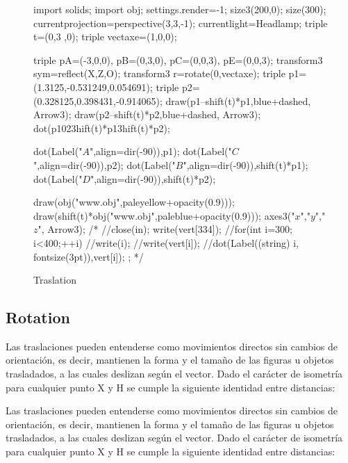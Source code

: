\begin{figure}[!ht]
	\centering
	\begin{asy}
	import solids;
	import  obj;
	settings.render=-1;
	size3(200,0);
	size(300);
	currentprojection=perspective(3,3,-1);
	currentlight=Headlamp;
	triple t=(0,3 ,0);
	triple vectaxe=(1,0,0);

	triple pA=(-3,0,0), pB=(0,3,0), pC=(0,0,3), pE=(0,0,3);
	transform3 sym=reflect(X,Z,O);
	transform3 r=rotate(0,vectaxe);
	triple p1=(1.3125,-0.531249,0.054691);
	triple p2=(0.328125,0.398431,-0.914065);
	draw(p1--shift(t)*p1,blue+dashed, Arrow3);
	draw(p2--shift(t)*p2,blue+dashed, Arrow3);
	dot(p1^^p2^^shift(t)*p1^^shift(t)*p2);

	dot(Label("$A$",align=dir(-90)),p1);
	dot(Label("$C$",align=dir(-90)),p2);
	dot(Label("$B$",align=dir(-90)),shift(t)*p1);
	dot(Label("$D$",align=dir(-90)),shift(t)*p2);

	draw(obj("www.obj",paleyellow+opacity(0.9)));
	draw(shift(t)*obj("www.obj",paleblue+opacity(0.9)));
	axes3("$x$","$y$","$z$", Arrow3);
	/*
	//close(in);
	write(vert[334]);
	//for(int i=300; i<400;++i){
	//write(i);
	//write(vert[i]);
	//dot(Label((string) i, fontsize(3pt)),vert[i]);
	};
	*/
	\end{asy}
	\caption{Traslation}
\end{figure}

 \subsection{Rotation}

 Las traslaciones pueden entenderse como movimientos directos sin cambios de orientación, es decir, mantienen la forma y el tamaño de las figuras u objetos trasladados, a las cuales deslizan según el vector. Dado el carácter de isometría para cualquier punto X y H se cumple la siguiente identidad entre distancias:

 Las traslaciones pueden entenderse como movimientos directos sin cambios de orientación, es decir, mantienen la forma y el tamaño de las figuras u objetos trasladados, a las cuales deslizan según el vector. Dado el carácter de isometría para cualquier punto X y H se cumple la siguiente identidad entre distancias:

